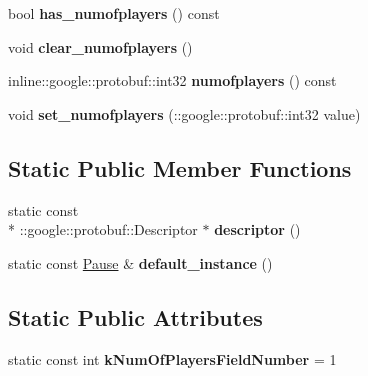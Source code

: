 \begin{DoxyCompactItemize}
\item 
\hypertarget{class_pause_afcdd5b8246226aafa60f6f639718271c}{bool {\bfseries has\-\_\-numofplayers} () const }\label{class_pause_afcdd5b8246226aafa60f6f639718271c}

\item 
\hypertarget{class_pause_a1a4311ac60f3ffcf15e10ad064df6a0f}{void {\bfseries clear\-\_\-numofplayers} ()}\label{class_pause_a1a4311ac60f3ffcf15e10ad064df6a0f}

\item 
\hypertarget{class_pause_a282ee0b2f04d64d41b1056bd5d64eea9}{inline\-::google\-::protobuf\-::int32 {\bfseries numofplayers} () const }\label{class_pause_a282ee0b2f04d64d41b1056bd5d64eea9}

\item 
\hypertarget{class_pause_ade24c4a530fb2eb508bf2f24b7a7e47f}{void {\bfseries set\-\_\-numofplayers} (\-::google\-::protobuf\-::int32 value)}\label{class_pause_ade24c4a530fb2eb508bf2f24b7a7e47f}

\end{DoxyCompactItemize}
\subsection*{Static Public Member Functions}
\begin{DoxyCompactItemize}
\item 
\hypertarget{class_pause_a25b48247864d5ce493fdf1363115076e}{static const \\*
\-::google\-::protobuf\-::\-Descriptor $\ast$ {\bfseries descriptor} ()}\label{class_pause_a25b48247864d5ce493fdf1363115076e}

\item 
\hypertarget{class_pause_a67c55d1187b0e4b77c9b74c0b8a6b5d7}{static const \hyperlink{class_pause}{Pause} \& {\bfseries default\-\_\-instance} ()}\label{class_pause_a67c55d1187b0e4b77c9b74c0b8a6b5d7}

\end{DoxyCompactItemize}
\subsection*{Static Public Attributes}
\begin{DoxyCompactItemize}
\item 
\hypertarget{class_pause_a3db8e5c058abd2047804f210d5f982ae}{static const int {\bfseries k\-Num\-Of\-Players\-Field\-Number} = 1}\label{class_pause_a3db8e5c058abd2047804f210d5f982ae}

\end{DoxyCompactItemize}
